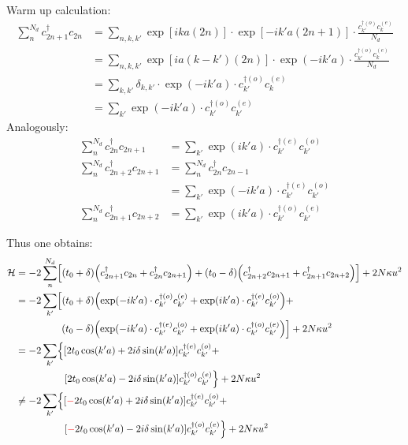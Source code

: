 Warm up calculation:
\begin{align*}
	\sum_n^{N_d}c_{2n+1}^\dagger c_{2n} &=\sum_{n, k, k'} \exp\left[ika(2n)\right] \cdot \exp\left[-ik'a(2n+1)\right] \cdot \frac{c_{k'}^{\dagger(o)}c_k^{(e)}}{N_d} \\
	&=\sum_{n, k, k'} \exp\left[ia(k-k')(2n)\right] \cdot \exp\left(-ik'a\right) \cdot  \frac{c_{k'}^{\dagger(o)}c_k^{(e)}}{N_d} \\
	&=\sum_{k, k'} \delta_{k, k'} \cdot \exp\left(-ik'a\right)\cdot c_{k'}^{\dagger(o)}c_k^{(e)}\\
	&=\sum_{k'} \exp\left(-ik'a\right) \cdot c_{k'}^{\dagger(o)}c_{k'}^{(e)}
\end{align*}
Analogously:
\begin{align*}
	\sum_n^{N_d} c_{2n}^\dagger c_{2n+1} &=\sum_{k'} \exp\left(ik'a\right)\cdot c_{k'}^{\dagger(e)}c_{k'}^{(o)}\\
	\sum_n^{N_d} c_{2n+2}^\dagger c_{2n+1} &= \sum_n^{N_d} c_{2n}^\dagger c_{2n-1}\\
	&=\sum_{k'} \exp\left(-ik'a\right)\cdot  c_{k'}^{\dagger(e)}c_{k'}^{(o)}\\
	\sum_n^{N_d} c_{2n+1}^\dagger c_{2n+2} &=\sum_{k'} \exp\left(ik'a\right)\cdot  c_{k'}^{\dagger(o)}c_{k'}^{(e)}
\end{align*}

Thus one obtains:
\begin{align}
	\mathcal{H} &= -2\sum_n^{N_d} \left[\left(t_0+\delta\right)\left(c_{2n+1}^\dagger c_{2n} + c_{2n}^\dagger c_{2n+1} \right) + 
	\left(t_0-\delta\right)\left(c_{2n+2}^\dagger c_{2n+1} + c_{2n+1}^\dagger c_{2n+2}\right)\right]+2N\kappa u^2\\
	&= -2\sum_{k'} \left[\left(t_0+\delta\right)\left(\exp\left(-ik'a\right) \cdot c_{k'}^{\dagger(o)}c_{k'}^{(e)} + \exp\left(ik'a\right)\cdot c_{k'}^{\dagger(e)}c_{k'}^{(o)}\right)+ \right.\nonumber\\
	&\hspace*{1.6cm}\left.\left(t_0-\delta\right)\left(\exp\left(-ik'a\right)\cdot  c_{k'}^{\dagger(e)}c_{k'}^{(o)}+\exp\left(ik'a\right)\cdot  c_{k'}^{\dagger(o)}c_{k'}^{(e)}\right)\right]+2N\kappa u^2\\
	&= -2\sum_{k'} \left\{\left[2t_0\cos(k'a) + 2i\delta\sin(k'a)\right]c_{k'}^{\dagger(e)}c_{k'}^{(o)} + \right.\nonumber\\
	&\hspace*{1.7cm}\left. \left[2t_0\cos(k'a)-2i\delta\sin(k'a)\right] c_{k'}^{\dagger(o)}c_{k'}^{(e)}\right\}+2N\kappa u^2\\
	&\neq-2\sum_{k'} \left\{\left[\textcolor{red}{-}2t_0\cos(k'a) + 2i\delta\sin(k'a)\right]c_{k'}^{\dagger(e)}c_{k'}^{(o)} + \right.\nonumber\\
	&\hspace*{1.7cm}\left. \left[\textcolor{red}{-}2t_0\cos(k'a)-2i\delta\sin(k'a)\right] c_{k'}^{\dagger(o)}c_{k'}^{(e)}\right\}+2N\kappa u^2
\end{align}

